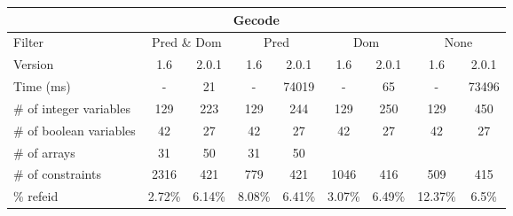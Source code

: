 \documentclass{standalone}
\begin{document}
\begin{table}[H]
\footnotesize
\begin{tabular}{lc|c|c|c|c|c|c|c}
\multicolumn{9}{c}{Gecode} \\ 
\hline\hline Filter & \multicolumn{2}{c|}{Pred \& Dom} &\multicolumn{2}{c|}{Pred}  & \multicolumn{2}{c|}{Dom} & \multicolumn{2}{c}{None} \\ 
\hline Version & 1.6 & 2.0.1 & 1.6 & 2.0.1 & 1.6 & 2.0.1 & 1.6 & 2.0.1 \\ 
Time (ms)               & - & 21 & - & 74019 & - & 65 & - & 73496 \\ 
\# of integer variables & 129 & 223 & 129 & 244 & 129 & 250 & 129 & 450 \\ 
\# of boolean variables & 42 & 27 & 42 & 27 & 42 & 27 & 42 & 27 \\ 
\# of arrays            & 31 & 50 & 31 & 50 &  &  &  &  \\ 
\# of constraints       & 2316 & 421 & 779 & 421 & 1046 & 416 & 509 & 415 \\ 
\% refeid               & 2.72\% & 6.14\% & 8.08\% & 6.41\% & 3.07\% & 6.49\% & 12.37\% & 6.5\% \\ 
\end{tabular}
\end{table}
\end{document}

